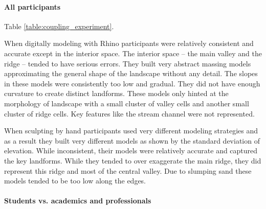 \documentclass[prodmode,acmtochi]{acmsmall} %
\begin{document}

\paragraph{All participants}
Table \ref{table:coupling_experiment}.

When digitally modeling with Rhino
participants were relatively 
consistent and accurate except in the interior space.
The interior space -- the main valley and the ridge -- 
tended to have serious errors.
%
They built very abstract massing models 
approximating the general shape of the landscape
without any detail. 
%
The slopes in these models 
were consistently too low and gradual.
They did not have enough curvature 
to create distinct landforms. 
%
These models only hinted at 
the morphology of landscape
with a small cluster of valley cells
and another small cluster of ridge cells.  
Key features like the stream channel
were not represented. 


When sculpting by hand 
participants used very different modeling strategies 
and as a result they built very different models
as shown by the standard deviation of elevation.
While inconsistent, 
their models were relatively accurate
and captured the key landforms.
While they tended to over exaggerate the main ridge, 
they did represent
this ridge and most of the central valley.
Due to slumping sand
these models tended to be too low along the edges. 







\paragraph{Students vs. academics and professionals}



\end{document}
